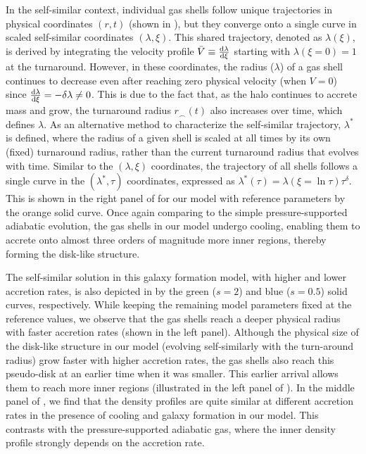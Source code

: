 In the self-similar context, individual gas shells follow unique trajectories in physical coordinates $(r,t)$ (shown in ), but they converge onto a single curve in scaled self-similar coordinates $(\lambda,\xi)$. This shared trajectory, denoted as $\lambda(\xi)$, is derived by integrating the velocity profile $\bar{V} \equiv \frac{{\rm d} \lambda}{{\rm d} \xi}$ starting with $\lambda(\xi=0)=1$ at the turnaround. However, in these coordinates, the radius ($\lambda$) of a gas shell continues to decrease even after reaching zero physical velocity (when $V=0$) since $\frac{{\rm d} \lambda}{{\rm d} \xi} = -\delta \lambda \neq 0$. This is due to the fact that, as the halo continues to accrete mass and grow, the turnaround radius $r_{\smallfrown}(t)$ also increases over time, which defines $\lambda$. As an alternative method to characterize the self-similar trajectory, $\lambda^*$ is defined, where the radius of a given shell is scaled at all times by its own (fixed) turnaround radius, rather than the current turnaround radius that evolves with time. Similar to the $(\lambda,\xi)$ coordinates, the trajectory of all shells follows a single curve in the $(\lambda^*,\tau)$ coordinates, expressed as $\lambda^*(\tau) = \lambda(\xi=\ln \tau) \tau^{\delta}$. This is shown in the right panel of  for our model with reference parameters by the orange solid curve. Once again comparing to the simple pressure-supported adiabatic evolution, the gas shells in our model undergo cooling, enabling them to accrete onto almost three orders of magnitude more inner regions, thereby forming the disk-like structure.

The self-similar solution in this galaxy formation model, with higher and lower accretion rates, is also depicted in  by the green ($s=2$) and blue ($s=0.5$) solid curves, respectively. While keeping the remaining model parameters fixed at the reference values, we observe that the gas shells reach a deeper physical radius with faster accretion rates (shown in the left panel). Although the physical size of the disk-like structure in our model (evolving self-similarly with the turn-around radius) grow faster with higher accretion rates, the gas shells also reach this pseudo-disk at an earlier time when it was smaller. This earlier arrival allows them to reach more inner regions (illustrated in the left panel of ). In the middle panel of , we find that the density profiles are quite similar at different accretion rates in the presence of cooling and galaxy formation in our model. This contrasts with the pressure-supported adiabatic gas, where the inner density profile strongly depends on the accretion rate.





